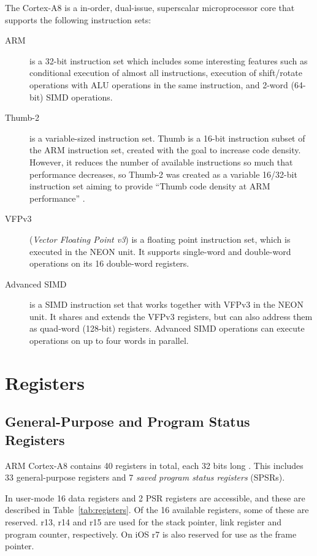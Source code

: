 \documentclass[oneside,a4paper]{report}
\begin{document}
The Cortex-A8 is a in-order, dual-issue, superscalar microprocessor core that supports the following instruction sets:
\begin{description}
	\item[ARM] is a 32-bit instruction set which includes some interesting features such as conditional execution of almost all instructions, execution of shift/rotate operations with ALU operations in the same instruction, and 2-word (64-bit) SIMD operations.
	
	\item[Thumb-2] is a variable-sized instruction set. Thumb is a 16-bit instruction subset of the ARM instruction set, created with the goal to increase code density. However, it reduces the number of available instructions so much that performance decreases, so Thumb-2 was created as a variable 16/32-bit instruction set aiming to provide ``Thumb code density at ARM performance'' \cite[p. 5]{Gris}.
	
	\item[VFPv3] (\emph{Vector Floating Point v3}) is a floating point instruction set, which is executed in the NEON unit. It supports single-word and double-word operations on its 16 double-word registers.
	
	\item[Advanced SIMD] is a SIMD instruction set that works together with VFPv3 in the NEON unit. It shares and extends the VFPv3 registers, but can also address them as quad-word (128-bit) registers. Advanced SIMD operations can execute operations on up to four words in parallel.
\end{description}

\chapter{Registers}

\section{General-Purpose and Program Status Registers}
ARM Cortex-A8 contains 40 registers in total, each 32 bits long \cite[p. 2-18]{A8Ref}. This includes 33 general-purpose registers and 7 \emph{saved program status registers} (SPSRs).

In user-mode 16 data registers and 2 PSR registers are accessible, and these are described in Table~\ref{tab:registers}. Of the 16 available registers, some of these are reserved. r13, r14 and r15 are used for the stack pointer, link register and program counter, respectively. On iOS r7 is also reserved for use as the frame pointer.
\end{document}
